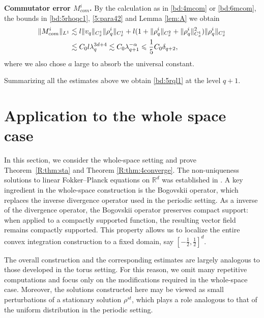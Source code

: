 \documentclass[UTF-8,reqno]{amsart}
\numberwithin{equation}{section}
\theoremstyle{definition}
\def\leq{\leqslant}
\def\leq{\leqslant}
\begin{document}
\textbf{Commutator error $M^i_{com} $.} By the calculation as in \eqref{bd:4mcom} or \eqref{bd:6mcom}, the bounds in   \eqref{bd:5rhoqc1}, \eqref{5:para42} and Lemma \ref{lem:A}  we obtain
 \begin{align}
  \|M^i_{ com} \|_{L^1}  & \lesssim l\|v_q\|_{C_{x}^1}\|\rho_q^i\|_{C_{x}^1}+l (1+  \| \rho_q^i\|_{C_{x}^2}+\| \rho_q^i\|_{C_{x}^1}^2)\| \rho_q^i\|_{C_{x}^1}\notag\\
 &\lesssim C_0 l\lambda_q^{3d+4}\lesssim  C_0  \lambda_{q+1}^{-\alpha}\leq \frac{1}{5}C_0 \delta_{q+2},\notag 
   \end{align}  
 where we also chose $a$ large to absorb the universal constant.
 
Summarizing all the estimates above  we obtain   \eqref{bd:5rql1} at the level $q+1$. 

  

\section{Application to the whole space case}\label{R:cogpss4}
In this section, we consider the whole-space setting and prove Theorem~\ref{R:thm:sta} and Theorem \ref{R:thm:4converge}. The non-uniqueness solutions to linear Fokker--Planck equations on $\mathbb{R}^d$ was established in \cite{LR25}. A key ingredient in the whole-space construction is the Bogovskii operator, which replaces the inverse divergence operator used in the periodic setting.
As a  inverse of the divergence operator, the Bogovskii operator preserves compact support: when applied to a compactly supported function, the resulting vector field remains compactly supported. This property allows us to localize the entire convex integration construction to a fixed domain, say $[-\frac12,\frac12]^d.$ 

The overall construction and the corresponding estimates are largely analogous to those developed in the torus setting. For this reason, we omit many repetitive computations and focus only on the modifications required in the whole-space case.
Moreover, the solutions constructed here may be viewed as small perturbations of a stationary solution $\rho^{ st}$, which  plays a role analogous to that of the uniform distribution in the periodic setting.
\end{document}
